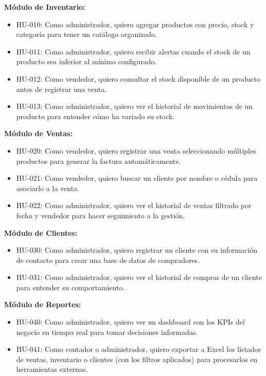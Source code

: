 \textbf{Módulo de Inventario:}

\begin{itemize}
\tightlist
\item
  HU-010: Como administrador, quiero agregar productos con precio, stock y categoría para tener un catálogo organizado.
\item
  HU-011: Como administrador, quiero recibir alertas cuando el stock de un producto sea inferior al mínimo configurado.
\item
  HU-012: Como vendedor, quiero consultar el stock disponible de un producto antes de registrar una venta.
\item
  HU-013: Como administrador, quiero ver el historial de movimientos de un producto para entender cómo ha variado su stock.
\end{itemize}

\textbf{Módulo de Ventas:}

\begin{itemize}
\tightlist
\item
  HU-020: Como vendedor, quiero registrar una venta seleccionando múltiples productos para generar la factura automáticamente.
\item
  HU-021: Como vendedor, quiero buscar un cliente por nombre o cédula para asociarlo a la venta.
\item
  HU-022: Como administrador, quiero ver el historial de ventas filtrado por fecha y vendedor para hacer seguimiento a la gestión.
\end{itemize}

\textbf{Módulo de Clientes:}

\begin{itemize}
\tightlist
\item
  HU-030: Como administrador, quiero registrar un cliente con su información de contacto para crear una base de datos de compradores.
\item
  HU-031: Como administrador, quiero ver el historial de compras de un cliente para entender su comportamiento.
\end{itemize}

\textbf{Módulo de Reportes:}

\begin{itemize}
\tightlist
\item
  HU-040: Como administrador, quiero ver un dashboard con los KPIs del negocio en tiempo real para tomar decisiones informadas.
\item
  HU-041: Como contador o administrador, quiero exportar a Excel los listados de ventas, inventario o clientes (con los filtros aplicados) para procesarlos en herramientas externas.
\end{itemize}

